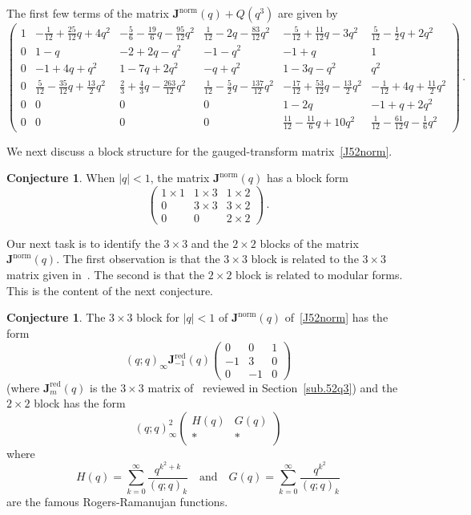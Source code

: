 \documentclass[12pt,reqno]{amsart}
\theoremstyle{definition}
\newtheorem{conjecture}[theorem]{Conjecture}
\def\be{\begin{equation}}
\def\ee{\end{equation}}
\def\bJ{\mathbf J}
\def\RED{\mathrm{red}}
\begin{document}
The first few terms of the matrix $\bJ^{\mathrm{norm}}(q)+Q(q^3)$ are given by
{\tiny
\be
\begin{pmatrix}
  1 & -\frac{1}{12} + \frac{25}{12}q + 4q^2
  & -\frac{5}{6} - \frac{19}{6}q - \frac{95}{12}q^2
  & \frac{1}{12} - 2q - \frac{83}{12}q^2 & -\frac{5}{12} + \frac{11}{12}q - 3q^2
  & \frac{5}{12} - \frac{1}{2}q + 2q^2\\
0 & 1 - q & -2 + 2q - q^2 & -1 - q^2 & -1 + q & 1\\
0 & -1 + 4q + q^2 & 1 - 7q + 2q^2 & -q + q^2 & 1 - 3q - q^2 & q^2\\
0 & \frac{5}{12} - \frac{35}{12}q + \frac{13}{2}q^2
& \frac{2}{3} + \frac{4}{3}q - \frac{263}{12}q^2
& \frac{1}{12} - \frac{5}{2}q - \frac{137}{12}q^2
& -\frac{17}{12} + \frac{53}{12}q - \frac{13}{2}q^2
& -\frac{1}{12} + 4q + \frac{11}{2}q^2\\
0 & 0 & 0 & 0 & 1 - 2q & -1 + q + 2q^2\\
0 & 0 & 0 & 0 & \frac{11}{12} - \frac{11}{6}q + 10q^2
& \frac{1}{12} - \frac{61}{12}q - \frac{1}{6}q^2
\end{pmatrix} \,.
\ee
}

We next discuss a block structure for the gauged-transform matrix~\eqref{J52norm}. 
\begin{conjecture}
\label{prop.52block}
When $|q|<1$, the matrix $\bJ^{\mathrm{norm}}(q)$ has a block form
\be
\begin{pmatrix}
1\times1 & 1\times3 & 1\times2\\
0 & 3\times 3 & 3\times 2\\
0 & 0 & 2\times2
\end{pmatrix} \,.
\ee
\end{conjecture}
Our next task is to identify the $3\times3$ and the $2\times2$ blocks of the
matrix $\bJ^{\mathrm{norm}}(q)$. The first observation is that the $3\times 3$ block
is related to the $3\times3$ matrix given in~\cite{GGM:resurgent}. The second is that
the $2\times 2$ block is related to modular forms. This is the content of the next
conjecture.

\begin{conjecture}
\label{DS2hid}
The $3\times3$ block for $|q|<1$ of $\bJ^{\mathrm{norm}}(q)$ of~\eqref{J52norm} has
the form
\be
(q;q)_{\infty}
\bJ_{-1}^\RED(q)
\begin{pmatrix}
  0&0&1\\
  -1&3&0\\
  0&-1&0
\end{pmatrix}
\ee
(where $\bJ_{m}^\RED(q)$ is the $3\times3$ matrix of~\cite{GGM:resurgent} reviewed
in Section~\ref{sub.52q3}) and the $2\times2$ block has the form
\be
(q;q)_{\infty}^{2}
\begin{pmatrix}
  H(q) & G(q)\\
  * & *
\end{pmatrix}
\ee
where
\be
  H(q)=\sum_{k=0}^{\infty}\frac{q^{k^{2}+k}}{(q;q)_{k}}
  \quad\text{and}\quad
  G(q)=\sum_{k=0}^{\infty}\frac{q^{k^{2}}}{(q;q)_{k}}
\ee
are the famous Rogers-Ramanujan functions. 
\end{conjecture}
\end{document}
